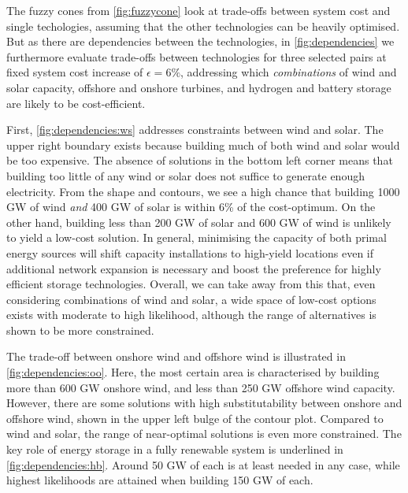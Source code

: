 The fuzzy cones from \cref{fig:fuzzycone} look at trade-offs between system cost
and single techologies, assuming that the other technologies can be heavily
optimised. But as there are dependencies between the technologies, in
\cref{fig:dependencies} we furthermore evaluate trade-offs between technologies
for three selected pairs at fixed system cost increase of $\epsilon=6\%$,
addressing which \textit{combinations} of wind and solar
capacity, offshore and onshore turbines, and hydrogen and battery storage are
likely to be cost-efficient.

First, \cref{fig:dependencies:ws} addresses constraints between wind and solar.
The upper right boundary exists because building much of both wind and solar
would be too expensive. The absence of solutions in the bottom left corner
means that building too little of any wind or solar does not suffice to generate
enough electricity. From the shape and contours, we see a high chance that
building 1000 GW of wind \textit{and} 400 GW of solar is within 6\% of the
cost-optimum. On the other hand, building less than 200 GW of solar and 600 GW
of wind is unlikely to yield a low-cost solution. In general, minimising the
capacity of both primal energy sources will shift capacity installations to
high-yield locations even if additional network expansion is necessary and boost
the preference for highly efficient storage technologies. Overall, we can take
away from this that, even considering combinations of wind and solar, a wide
space of low-cost options exists with moderate to high likelihood, although the
range of alternatives is shown to be more constrained.

The trade-off between onshore wind and offshore wind is illustrated in
\cref{fig:dependencies:oo}. Here, the most certain area is characterised by
building more than 600 GW onshore wind, and less than 250 GW offshore wind
capacity. However, there are some solutions with high substitutability between
onshore and offshore wind, shown in the upper left bulge of the contour plot.
Compared to wind and solar, the range of near-optimal solutions is even more
constrained. The key role of energy storage in a fully renewable system is
underlined in \cref{fig:dependencies:hb}. Around 50 GW of each is at least
needed in any case, while highest likelihoods are attained when building 150 GW
of each.

